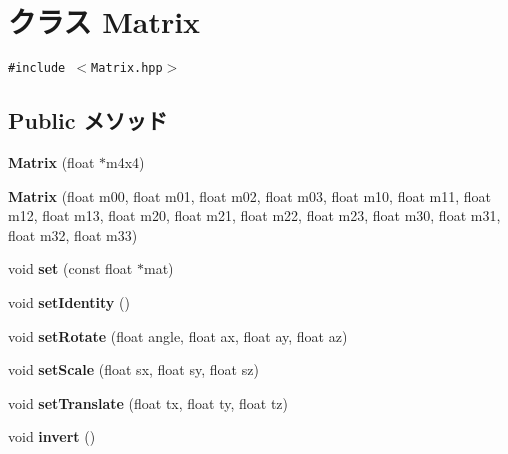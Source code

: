 \hypertarget{classm3g_1_1Matrix}{
\section{クラス Matrix}
\label{classm3g_1_1Matrix}
}
{\tt \#include $<$Matrix.hpp$>$}

\subsection*{Public メソッド}
\begin{CompactItemize}
\item 
\hypertarget{classm3g_1_1Matrix_04fd433badb74a2d60395217701d4009}{
\textbf{Matrix} (float $\ast$m4x4)}
\label{classm3g_1_1Matrix_04fd433badb74a2d60395217701d4009}

\item 
\hypertarget{classm3g_1_1Matrix_2c2f600f3a4c1db4a0da0b57db8aebca}{
\textbf{Matrix} (float m00, float m01, float m02, float m03, float m10, float m11, float m12, float m13, float m20, float m21, float m22, float m23, float m30, float m31, float m32, float m33)}
\label{classm3g_1_1Matrix_2c2f600f3a4c1db4a0da0b57db8aebca}

\item 
\hypertarget{classm3g_1_1Matrix_ed427d2cd38fe4a0b23f7f80803b7fd5}{
void \textbf{set} (const float $\ast$mat)}
\label{classm3g_1_1Matrix_ed427d2cd38fe4a0b23f7f80803b7fd5}

\item 
\hypertarget{classm3g_1_1Matrix_382e6ad7e6721b121e510959e1011be3}{
void \textbf{setIdentity} ()}
\label{classm3g_1_1Matrix_382e6ad7e6721b121e510959e1011be3}

\item 
\hypertarget{classm3g_1_1Matrix_c4e04770db1fedff14c37b5e4e4a68c6}{
void \textbf{setRotate} (float angle, float ax, float ay, float az)}
\label{classm3g_1_1Matrix_c4e04770db1fedff14c37b5e4e4a68c6}

\item 
\hypertarget{classm3g_1_1Matrix_937d04042c25021532ea2532fe5e3a32}{
void \textbf{setScale} (float sx, float sy, float sz)}
\label{classm3g_1_1Matrix_937d04042c25021532ea2532fe5e3a32}

\item 
\hypertarget{classm3g_1_1Matrix_550cf39dca5ec8d74d719b0dcdecdd4b}{
void \textbf{setTranslate} (float tx, float ty, float tz)}
\label{classm3g_1_1Matrix_550cf39dca5ec8d74d719b0dcdecdd4b}

\item 
\hypertarget{classm3g_1_1Matrix_7fa1616cc61c19a5efcc863c950f7f30}{
void \textbf{invert} ()}
\label{classm3g_1_1Matrix_7fa1616cc61c19a5efcc863c950f7f30}


\end{CompactItemize}
